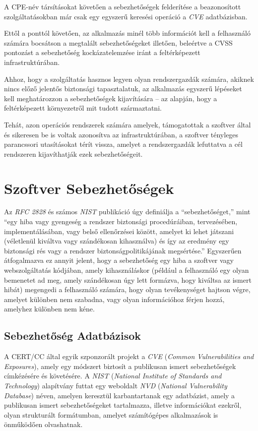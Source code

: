 \documentclass[a4paper,12pt]{article}
\begin{document}
	A CPE-név társításokat követően a sebezhetőségek felderítése a beazonosított szolgáltatásokban már csak egy egyszerű keresési operáció a \textit{CVE} adatbázisban.
	
	Ettől a ponttól követően, az alkalmazás minél több információt kell a felhasználó számára bocsátson a megtalált sebezhetőségeket illetően, beleértve a CVSS pontozást a sebezhetőség kockázatelemzése iránt a feltérképezett infrastruktúrában.

	Ahhoz, hogy a szolgáltatás hasznos legyen olyan rendszergazdák számára, akiknek nincs előző jelentős biztonsági tapasztalatuk, az alkalmazás egyszerű lépéseket kell meghatározzon a sebezhetőségek kijavítására -- az alapján, hogy a feltérképezett környezetről mit tudott származtatni.

	Tehát, azon operációs rendszerek számára amelyek, támogatottak a szoftver által és sikeresen be is voltak azonosítva az infrastruktúrában, a szoftver tényleges parancssori utasításokat térít vissza, amelyet a rendszergazdák lefuttatva a cél rendszeren kijavíthatják ezek sebezhetőségeit.
	
\section{Szoftver Sebezhetőségek}
	
	Az \textit{RFC 2828} és számos \textit{NIST} publikáció úgy definiálja a ``sebezhetőséget,'' mint ``egy hiba vagy gyengeség a rendszer biztonsági procedúráiban, tervezésében, implementálásában, vagy belső ellenőrzései között, amelyet ki lehet játszani (véletlenül kiváltva vagy szándékosan kihasználva) és így az eredmény egy biztonsági rés vagy a rendszer biztonságpolitikájának megsértése.''\cite{rfc2828,nist80030} Egyszerűen átfogalmazva ez annyit jelent, hogy a sebezhetőség egy hiba a szoftver vagy webszolgáltatás kódjában, amely kihasználáskor (például a felhasználó egy olyan bemenetet ad meg, amely szándékosan úgy lett formázva, hogy kiváltsa az ismert hibát) megengedi a felhasználó számára, hogy olyan tevékenységet hajtson végre, amelyet különben nem szabadna, vagy olyan információhoz férjen hozzá, amelyhez különben nem kéne.
	
\subsection{Sebezhetőség Adatbázisok} \label{ssec:vulndbs}
	
	A CERT/CC által egyik szponzorált projekt a \textit{CVE} (\textit{Common Vulnerabilities and Exposures}), amely egy módszert biztosít a publikusan ismert sebezhetőségek címkézésére és követésére. A \textit{NIST} (\textit{National Institute of Standards and Technology}) alapítvány futtat egy weboldalt \textit{NVD} (\textit{National Vulnerability Database}) néven, amelyen keresztül karbantartanak egy adatbázist, amely a publikusan ismert sebezhetőségeket tartalmazza, illetve információkat ezekről, olyan strukturált formátumban, amelyet számítógépes alkalmazások is önműködően olvashatnak\cite{nvd15}.
	
\end{document}
